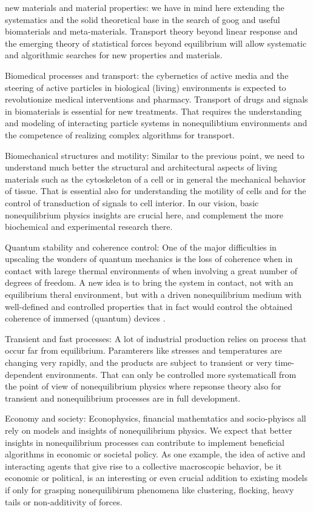 \begin{compactenum}
\item new materials and material properties: we have in mind here extending the systematics and the solid theoretical base in the search of goog and useful biomaterials and meta-materials.  Transport theory beyond linear response and the emerging theory of statistical forces beyond equilibrium will allow systematic and algorithmic searches for new properties and materials.
\item Biomedical processes and transport:  the cybernetics of active media and the steering of active particles in biological (living) environments is expected to revolutionize medical interventions and pharmacy.  Transport of drugs and signals in biomaterials is essential for new treatments.  That requires the understanding and modeling of interacting particle systems in nonequilibtium environments and the competence of realizing complex algorithms for transport.
\item Biomechanical structures and motility: Similar to the previous point, we need to understand much better the structural and architectural aspects of living materials such as the cytoskeleton of a cell or in general the mechanical behavior of tissue.  That is essential also for understanding the motility of cells and for the control of transduction of signals to cell interior.  In our vision, basic nonequilibrium physics insights are crucial here, and complement the more biochemical and experimental research there.
\item Quantum stability and coherence control: One of the major difficulties in upscaling the wonders of quantum mechanics is the loss of coherence when in contact with larege thermal environments of when involving a great number of degrees of freedom.  A new idea is to bring the system in contact, not with an equilibrium theral environment, but with a driven nonequilibrium medium with well-defined and controlled properties that in fact would control the obtained coherence of immersed (quantum) devices .
\item Transient and fast processes: A lot of industrial production relies on process that occur far from equilibrium.  Paramterers like stresses and temperatures are changing very rapidly, and the products are subject to transient or very time-dependent environments. That can only be controlled more systematicall from the point of view of nonequilibrium physics where repsonse theory also for transient and nonequilibrium processes are in full development.
\item Economy and society:  Econophysics, financial mathemtatics and socio-phyiscs all rely on models and insights of nonequilibrium physics. We expect that better insights in nonequilibrium processes can contribute to implement beneficial algorithms in economic or societal policy.  As one example, the idea of active and interacting agents that give rise to a collective macroscopic behavior, be it economic or political, is an interesting or even crucial addition to existing models if only for grasping nonequilibirum phenomena like clustering, flocking, heavy tails or non-additivity of forces.

\end{compactenum}
